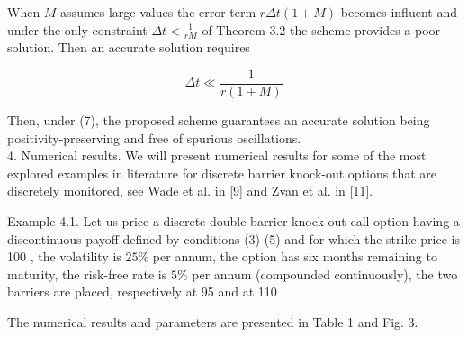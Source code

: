 \documentclass[10pt]{article}
\begin{document}
When $M$ assumes large values the error term $r \Delta t(1+M)$ becomes influent and under the only constraint $\Delta t<\frac{1}{r M}$ of Theorem 3.2 the scheme provides a poor solution. Then an accurate solution requires


\begin{equation*}
\Delta t \ll \frac{1}{r(1+M)} \tag{7}
\end{equation*}


Then, under (7), the proposed scheme guarantees an accurate solution being positivity-preserving and free of spurious oscillations.\\[0pt]
4. Numerical results. We will present numerical results for some of the most explored examples in literature for discrete barrier knock-out options that are discretely monitored, see Wade et al. in [9] and Zvan et al. in [11].

Example 4.1. Let us price a discrete double barrier knock-out call option having a discontinuous payoff defined by conditions (3)-(5) and for which the strike price is 100 , the volatility is $25 \%$ per annum, the option has six months remaining to maturity, the risk-free rate is $5 \%$ per annum (compounded continuously), the two barriers are placed, respectively at 95 and at 110 .

The numerical results and parameters are presented in Table 1 and Fig. 3.
\end{document}
